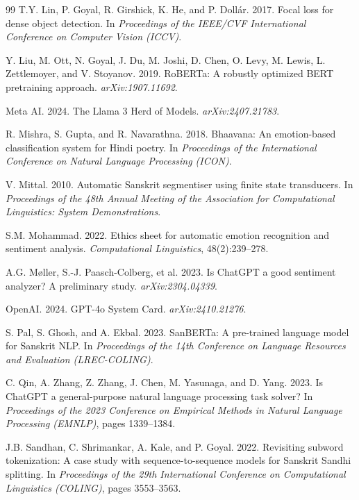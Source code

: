 \documentclass[11pt]{article}
\begin{document}
\begin{thebibliography}{99}
 T.Y. Lin, P. Goyal, R. Girshick, K. He, and P. Doll{\'{a}}r. 2017. Focal loss for dense object detection. In \emph{Proceedings of the IEEE/CVF International Conference on Computer Vision (ICCV)}.

 Y. Liu, M. Ott, N. Goyal, J. Du, M. Joshi, D. Chen, O. Levy, M. Lewis, L. Zettlemoyer, and V. Stoyanov. 2019. RoBERTa: A robustly optimized BERT pretraining approach. \emph{arXiv:1907.11692}.

 Meta AI. 2024. The Llama 3 Herd of Models. \emph{arXiv:2407.21783}.

 R. Mishra, S. Gupta, and R. Navarathna. 2018. Bhaavana: An emotion-based classification system for Hindi poetry. In \emph{Proceedings of the International Conference on Natural Language Processing (ICON)}.

 V. Mittal. 2010. Automatic Sanskrit segmentiser using finite state transducers. In \emph{Proceedings of the 48th Annual Meeting of the Association for Computational Linguistics: System Demonstrations}.

 S.M. Mohammad. 2022. Ethics sheet for automatic emotion recognition and sentiment analysis. \emph{Computational Linguistics}, 48(2):239--278.

 A.G. M{\o}ller, S.-J. Paasch-Colberg, et al. 2023. Is ChatGPT a good sentiment analyzer? A preliminary study. \emph{arXiv:2304.04339}.

 OpenAI. 2024. GPT-4o System Card. \emph{arXiv:2410.21276}.

 S. Pal, S. Ghosh, and A. Ekbal. 2023. SanBERTa: A pre-trained language model for Sanskrit NLP. In \emph{Proceedings of the 14th Conference on Language Resources and Evaluation (LREC-COLING)}.

 C. Qin, A. Zhang, Z. Zhang, J. Chen, M. Yasunaga, and D. Yang. 2023. Is ChatGPT a general-purpose natural language processing task solver? In \emph{Proceedings of the 2023 Conference on Empirical Methods in Natural Language Processing (EMNLP)}, pages 1339--1384.

 J.B. Sandhan, C. Shrimankar, A. Kale, and P. Goyal. 2022. Revisiting subword tokenization: A case study with sequence-to-sequence models for Sanskrit Sandhi splitting. In \emph{Proceedings of the 29th International Conference on Computational Linguistics (COLING)}, pages 3553--3563.



\end{thebibliography}
\end{document}
